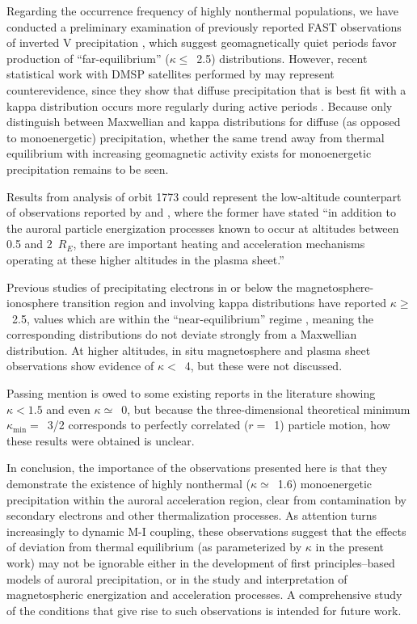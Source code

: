   Regarding the occurrence frequency of highly nonthermal populations, we have
  conducted a preliminary examination of previously reported FAST observations
  of inverted V precipitation
  \citep{McFadden1998a,Carlson2001,Janhunen2001,Dombeck2013}, which suggest
  geomagnetically quiet periods favor production of ``far-equilibrium''
  ($\kappa \leq$~2.5) distributions. However, recent statistical work with DMSP
  satellites performed by \citet{McIntosh2014} may represent counterevidence,
  since they show that diffuse precipitation that is best fit with a kappa
  distribution occurs more regularly during active periods \citep[e.g., Figure~7
  in][]{McIntosh2014}. Because \citet{McIntosh2014} only distinguish between
  Maxwellian and kappa distributions for diffuse (as opposed to monoenergetic)
  precipitation, whether the same trend away from thermal equilibrium with
  increasing geomagnetic activity exists for monoenergetic precipitation remains
  to be seen.

  Results from analysis of orbit 1773 could represent the low-altitude
  counterpart of observations reported by \citet{Wygant2002} and
  \citet{Schriver2003}, where the former have stated ``in addition to the
  auroral particle energization processes known to occur at altitudes between
  0.5 and 2~$R_E$, there are important heating and acceleration mechanisms
  operating at these higher altitudes in the plasma sheet.''

  Previous studies of precipitating electrons in or below the
  magnetosphere-ionosphere transition region and involving kappa distributions
  \citep{Olsson1998,Ogasawara2006,Kaeppler2014a} have reported $\kappa
  \geq$~2.5, values which are within the ``near-equilibrium'' regime
  \citep{Livadiotis2010}, meaning the corresponding distributions do not deviate
  strongly from a Maxwellian distribution. At higher altitudes, in situ
  magnetosphere and plasma sheet observations
  \citet{Christon1989,Christon1991,Kletzing2003} show evidence of $\kappa <$~4,
  but these were not discussed.

  Passing mention is owed to some existing reports in the literature showing
  $\kappa < 1.5$ and even $\kappa \simeq$~0, but because the three-dimensional
  theoretical minimum $\kappa_{\mathrm{min}} =$~3/2 corresponds to perfectly
  correlated ($r =$~1) particle motion, how these results were obtained is
  unclear.

  In conclusion, the importance of the observations presented here is that they
  demonstrate the existence of highly nonthermal ($\kappa \simeq$~1.6)
  monoenergetic precipitation within the auroral acceleration region, clear from
  contamination by secondary electrons and other thermalization processes. As
  attention turns increasingly to dynamic M-I coupling, these observations
  suggest that the effects of deviation from thermal equilibrium (as
  parameterized by $\kappa$ in the present work) may not be ignorable either in
  the development of first principles--based models of auroral precipitation, or
  in the study and interpretation of magnetospheric energization and
  acceleration processes. A comprehensive study of the conditions that give rise
  to such observations is intended for future work.

